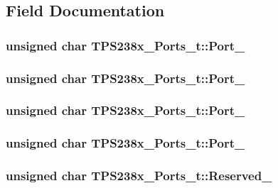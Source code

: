 \subsection{Field Documentation}
\hypertarget{struct_t_p_s238x___ports__t_ab93d3ac7c0e32d65c779922584ee852d}{
\subsubsection[{Port\-\_\-1}]{\setlength{\rightskip}{0pt plus 5cm}unsigned char T\-P\-S238x\-\_\-\-Ports\-\_\-t\-::\-Port\-\_}}\label{struct_t_p_s238x___ports__t_ab93d3ac7c0e32d65c779922584ee852d}
\hypertarget{struct_t_p_s238x___ports__t_aa11042d2e7681c66717400b79001b6da}{
\subsubsection[{Port\-\_\-2}]{\setlength{\rightskip}{0pt plus 5cm}unsigned char T\-P\-S238x\-\_\-\-Ports\-\_\-t\-::\-Port\-\_}}\label{struct_t_p_s238x___ports__t_aa11042d2e7681c66717400b79001b6da}
\hypertarget{struct_t_p_s238x___ports__t_a047de2b5245cf8e987eea9f6fc03007d}{
\subsubsection[{Port\-\_\-3}]{\setlength{\rightskip}{0pt plus 5cm}unsigned char T\-P\-S238x\-\_\-\-Ports\-\_\-t\-::\-Port\-\_}}\label{struct_t_p_s238x___ports__t_a047de2b5245cf8e987eea9f6fc03007d}
\hypertarget{struct_t_p_s238x___ports__t_a0bb3fb7e7c66a19930bc41304fa1c5df}{
\subsubsection[{Port\-\_\-4}]{\setlength{\rightskip}{0pt plus 5cm}unsigned char T\-P\-S238x\-\_\-\-Ports\-\_\-t\-::\-Port\-\_}}\label{struct_t_p_s238x___ports__t_a0bb3fb7e7c66a19930bc41304fa1c5df}
\hypertarget{struct_t_p_s238x___ports__t_a3c69d98f3fff7c88f0c910f33dea57e6}{
\subsubsection[{Reserved\-\_\-100}]{\setlength{\rightskip}{0pt plus 5cm}unsigned char T\-P\-S238x\-\_\-\-Ports\-\_\-t\-::\-Reserved\-\_}}\label{struct_t_p_s238x___ports__t_a3c69d98f3fff7c88f0c910f33dea57e6}


